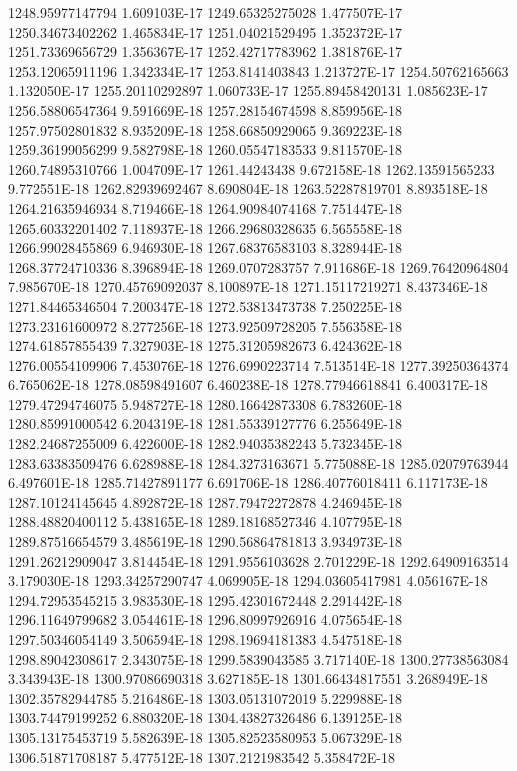 1248.95977147794  1.609103E-17
1249.65325275028  1.477507E-17
1250.34673402262  1.465834E-17
1251.04021529495  1.352372E-17
1251.73369656729  1.356367E-17
1252.42717783962  1.381876E-17
1253.12065911196  1.342334E-17
1253.8141403843  1.213727E-17
1254.50762165663  1.132050E-17
1255.20110292897  1.060733E-17
1255.89458420131  1.085623E-17
1256.58806547364  9.591669E-18
1257.28154674598  8.859956E-18
1257.97502801832  8.935209E-18
1258.66850929065  9.369223E-18
1259.36199056299  9.582798E-18
1260.05547183533  9.811570E-18
1260.74895310766  1.004709E-17
1261.44243438  9.672158E-18
1262.13591565233  9.772551E-18
1262.82939692467  8.690804E-18
1263.52287819701  8.893518E-18
1264.21635946934  8.719466E-18
1264.90984074168  7.751447E-18
1265.60332201402  7.118937E-18
1266.29680328635  6.565558E-18
1266.99028455869  6.946930E-18
1267.68376583103  8.328944E-18
1268.37724710336  8.396894E-18
1269.0707283757  7.911686E-18
1269.76420964804  7.985670E-18
1270.45769092037  8.100897E-18
1271.15117219271  8.437346E-18
1271.84465346504  7.200347E-18
1272.53813473738  7.250225E-18
1273.23161600972  8.277256E-18
1273.92509728205  7.556358E-18
1274.61857855439  7.327903E-18
1275.31205982673  6.424362E-18
1276.00554109906  7.453076E-18
1276.6990223714  7.513514E-18
1277.39250364374  6.765062E-18
1278.08598491607  6.460238E-18
1278.77946618841  6.400317E-18
1279.47294746075  5.948727E-18
1280.16642873308  6.783260E-18
1280.85991000542  6.204319E-18
1281.55339127776  6.255649E-18
1282.24687255009  6.422600E-18
1282.94035382243  5.732345E-18
1283.63383509476  6.628988E-18
1284.3273163671  5.775088E-18
1285.02079763944  6.497601E-18
1285.71427891177  6.691706E-18
1286.40776018411  6.117173E-18
1287.10124145645  4.892872E-18
1287.79472272878  4.246945E-18
1288.48820400112  5.438165E-18
1289.18168527346  4.107795E-18
1289.87516654579  3.485619E-18
1290.56864781813  3.934973E-18
1291.26212909047  3.814454E-18
1291.9556103628  2.701229E-18
1292.64909163514  3.179030E-18
1293.34257290747  4.069905E-18
1294.03605417981  4.056167E-18
1294.72953545215  3.983530E-18
1295.42301672448  2.291442E-18
1296.11649799682  3.054461E-18
1296.80997926916  4.075654E-18
1297.50346054149  3.506594E-18
1298.19694181383  4.547518E-18
1298.89042308617  2.343075E-18
1299.5839043585  3.717140E-18
1300.27738563084  3.343943E-18
1300.97086690318  3.627185E-18
1301.66434817551  3.268949E-18
1302.35782944785  5.216486E-18
1303.05131072019  5.229988E-18
1303.74479199252  6.880320E-18
1304.43827326486  6.139125E-18
1305.13175453719  5.582639E-18
1305.82523580953  5.067329E-18
1306.51871708187  5.477512E-18
1307.2121983542  5.358472E-18
